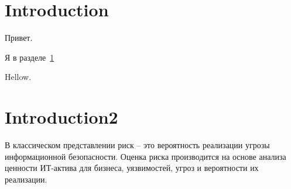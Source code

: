\documentclass[a4paper, 12pt]{article}
\begin{document}
    \section{Introduction}\label{sec:introduction}
    Привет.~\cite{managementsystem}

    Я в разделе~\ref{sec:introduction}

    Hellow.
    \section{Introduction2}\label{sec:introduction2}
    В классическом представлении риск – это вероятность реализации угрозы информационной безопасности.
    Оценка риска производится на основе анализа ценности ИТ-актива для бизнеса, уязвимостей, угроз и вероятности их реализации.
    
    
\end{document}
